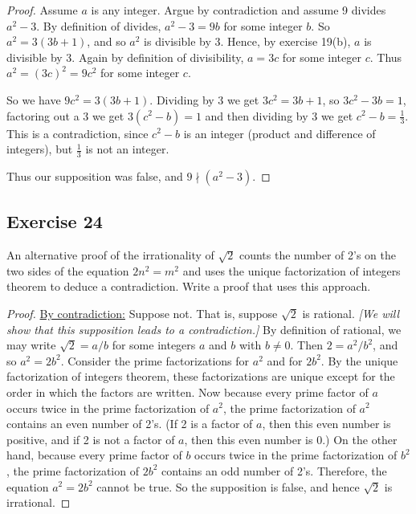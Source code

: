 \documentclass[14pt]{extarticle}
\begin{document}
\begin{proof}
    Assume $a$ is any integer. Argue by contradiction and assume 9 divides $a^2 - 3$. By definition of divides, $a^2 - 3 = 9b$ for some integer $b$. So $a^2 = 3(3b + 1)$, and so $a^2$ is divisible by 3. Hence, by exercise 19(b), $a$ is divisible by 3. Again by definition of divisibility, $a = 3c$ for some integer $c$. Thus $a^2 = (3c)^2 = 9c^2$ for some integer $c$.

    So we have $9c^2 = 3(3b+1)$. Dividing by 3 we get $3c^2 = 3b+1$, so $3c^2 - 3b = 1$, factoring out a 3 we get $3(c^2 - b) = 1$ and then dividing by 3 we get $c^2 - b = \frac{1}{3}$. This is a contradiction, since $c^2 - b$ is an integer (product and difference of integers), but $\frac{1}{3}$ is not an integer.

    Thus our supposition was false, and $9 \nmid (a^2 - 3)$.
\end{proof}

\subsection{Exercise 24}
An alternative proof of the irrationality of $\sqrt{2}$ counts the number of 2’s on the two sides of the equation $2n^2 = m^2$ and uses the unique factorization of integers theorem to deduce a contradiction. Write a proof that uses this approach.

\begin{proof}
    \underline{By contradiction:} Suppose not. That is, suppose
    $\sqrt{2}$ is rational. {\it [We will show that this supposition leads to a contradiction.]} By definition of rational, we may write $\sqrt{2} = a/b$ for some integers $a$ and $b$ with $b \neq 0$. Then $2 = a^2/b^2$, and so $a^2 = 2b^2$. Consider the prime factorizations for $a^2$ and for $2b^2$. By the unique factorization of integers theorem, these factorizations are unique except for the order in which the factors are written. Now because every prime factor of $a$ occurs twice in the prime factorization of $a^2$, the prime factorization of $a^2$ contains an even number of 2’s. (If 2 is a factor of $a$, then this even number is positive, and if 2 is not a factor of $a$, then this even number is 0.) On the other hand, because every prime factor of $b$ occurs twice in the prime factorization of $b^2$, the prime factorization of $2b^2$ contains an odd number of 2’s. Therefore, the equation $a^2 = 2b^2$ cannot be true. So the supposition is false, and hence $\sqrt{2}$ is irrational.
\end{proof}
\end{document}
